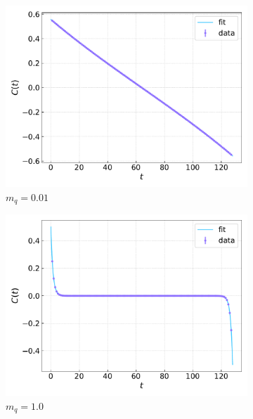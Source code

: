 \begin{figure}
    \centering
    \begin{subfigure}[b]{0.48\textwidth}
        \includegraphics[width=1.05\textwidth]{figures/correlator/corrs_free/corr_small.pdf}
        \caption{$m_q = 0.01$}
    \end{subfigure}
    \hfill
    \begin{subfigure}[b]{0.48\textwidth}
        \includegraphics[width=1.05\textwidth]{figures/correlator/corrs_free/corr_big.pdf}
        \caption{$m_q = 1.0$}
    \end{subfigure}
    \\
    \vspace{10pt}
    \begin{subfigure}[b]{0.68\textwidth}

\end{subfigure}
\end{figure}
